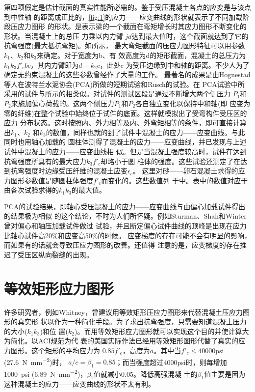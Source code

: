 \documentclass[12pt,a4paper]{book}
\begin{document}
第四项假定是估计截面的真实性能所必需的。鉴于受压混凝土各点的应变是与该点到中性轴
的距离成正比的，\cref{fig:1}的应力——应变曲线的形状就表示了不同加载阶段压应力图形
的形状。是表示梁的一个截面在弯矩增长时其应力图形不断变化的形状。当混凝土上的总压
力乘以内力臂 $jd$达到最大值时，这个截面就达到了它的抗弯强度(最大抵抗弯矩)。如所示，
最大弯矩截面的压应力图形特征可以用参数$k_1$、$k_2$和$k_3$来确定。对于宽度为b、有
效高度为d的矩形截面，混凝土的总压力为$k_1k_3f'_cbc$，其内力臂即为$d-k_2c$，此处c
为受压边缘到中和轴的距离。不少人为了确定无约束混凝土的这些参数曾经作了大量的工作。
最著名的成果是由Hognestad等人在波特兰水泥协会(PCA)所做的短期试验和Rusch的试验。在
PCA试验中所采用的试件与所示的相类似。对试件的测试区段是通过不断增大两个侧压力
$P_1$和$P_2$来施加偏心荷载的。这两个侧压力$P_1$和$P_2$各自独立变化以保持中和轴(即
应变为零的纤维)在整个试验中始终位于试件的底面。这样就模拟出了受弯构件受压区的应力
分布状态。这时按照内、外力相等及内、外弯矩相等的条件，即可直接计算出$k_1$、$k_2$
和$k_3$的数值，同样也就的到了试件中混凝土的应力——应变曲线。与此同时也用轴心加载的
圆柱体测得了混凝土的应力——应变曲线，并已发现与上述试件中混凝土的应力——应变曲线相
似。但是当混凝土强度较高时，试件在达到抗弯强度所具有的最大应力$k_3f'_c$却略小于圆
柱体的强度。这些试验还测定了在达到抗弯强度时边缘受压纤维的混凝土应变$\epsilon_c$。
这里对砂——卵石混凝土求得的应力图形参数值是随圆柱体强度$f'_c$而变化的。这些数值列
于中。表中的数值对应于由各次试验求得的$k_1k_3$的最大值。

PCA的试验结果，即轴心受压混凝土的应力——应变曲线与由偏心加载试件得出的结果极为相似
的这个结论，不时为人们所怀疑。例如Sturman、Shah和Winter曾对偏心和轴压加载试件做过
试验，并且断定偏心试件曲线的顶峰是出现在应力比轴心试件高20\%和应变高50\%的时候。
应变梯度的存在可能不会有明显的影响，而如果有的话就会导致压应力图形的改善。还值得
注意的是，应变梯度的存在推迟了受压区纵向裂缝的出现。

\section{等效矩形应力图形}

许多研究者，例如Whitney，曾建议用等效矩形压应力图形来代替混凝土压应力图形的真实形
状以作为一种简化手段。为了求出抗弯强度，只需要知道混凝土压力的大小($k_1k_3$)和位
置($k_2$)。而用等效矩形应力图形就可以实现这个目的并使计算大为简化。以ACI规范为代
表的美国实际作法已经用等效矩形图形代替了真实的应力图形。这个矩形的平均应力为
$0.85f'_c$，高度为$a$。其中当$f'_c\le
40000\mathrm{psi}$(\SI{27.6}{\newton\per\square\milli\meter})时，
$a/c=\beta_1=0.85$；而当强度超过4000psi时，则每增加\SI{1000}{psi}
(\SI{6.89}{\newton\per\square\milli\meter})，$\beta_1$值就减小0.05。降低高强混凝
土的$\beta_1$值主要是因为这种混凝土的应力——应变曲线的形状不太有利。
\end{document}

